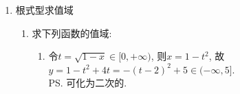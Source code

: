 \begin{enumerate}
\begin{enumerate}
\begin{jieda}
\begin{enumerate}
        \item $y=\frac{(x^2+1)^2-(x^2+1)+5}{(x^2+1)^2}=1 - \frac{1}{(x^2+1)} + \frac{5}{(x^2+1)^2}$. \\
        令$t = \frac{1}{(x^2+1)}, t \in (0, 1]$，故$y = 5t^2-t+1 \in [\frac{19}{20}, 5]$
        \end{enumerate}
        \end{jieda}
    \end{enumerate}
    \item 根式型求值域
    \begin{enumerate}
        \item 求下列函数的值域: \\
        \begin{jieda}
        \begin{enumerate}
        \item 令$t=\sqrt{1-x}\in[0,+\infty)$, 则$x=1-t^2$, 故$y=1-t^2+4t=-(t-2)^2+5\in(-\infty,5]$. \\
        \ps 可化为二次的. 
        

\end{enumerate}
\end{jieda}
\end{enumerate}
\end{enumerate}
